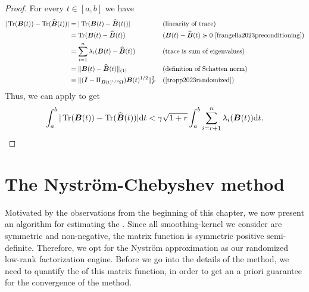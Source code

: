 \begin{proof}
     For every $t \in [a, b]$ we have
    \begin{align}
        |\Tr(\mtx{B}(t)) - \Tr(\widehat{\mtx{B}}(t))|
            &= |\Tr(\mtx{B}(t) - \widehat{\mtx{B}}(t))| && \text{(linearity of trace)} \notag \\ 
            &= \Tr(\mtx{B}(t) - \widehat{\mtx{B}}(t)) &&  \text{($\mtx{B}(t) - \widehat{\mtx{B}}(t) \succcurlyeq 0$ \cite[lemma~2.1]{frangella2023preconditioning})} \notag \\ 
            &= \sum_{i=1}^n \lambda_i(\mtx{B}(t) - \widehat{\mtx{B}}(t)) &&  \text{(trace is sum of eigenvalues)} \notag \\
            &= \lVert \mtx{B}(t) - \widehat{\mtx{B}}(t) \rVert _{(1)} && \text{(definition of Schatten norm)} \notag \\
            &= \lVert (\mtx{I} - \Pi_{\mtx{B}(t)^{1/2} \mtx{\Omega}})\mtx{B}(t)^{1/2} \rVert _F^2 && \text{(\cite[proof of corollary 8.8]{tropp2023randomized})}
    \end{align}
    Thus, we can apply \cite[theorem~9]{kressner2023randomized} to get
    \begin{equation}
        \int_{a}^{b} |\operatorname{Tr}(\boldsymbol{B}(t)) - \operatorname{Tr}(\widehat{\boldsymbol{B}}(t))| \mathrm{d}t
            < \gamma \sqrt{1 + r} \int_{a}^{b} \sum_{i = r+1}^n \lambda_i(\boldsymbol{B}(t)) \mathrm{d}t.
    \end{equation}
\end{proof}


\section{The Nystr\"om-Chebyshev method}
\label{sec:3-nystrom-nystrom-chebyshev}

Motivated by the observations from the beginning of this chapter, we now present
an algorithm for estimating the .
Since all \gls{smoothing-kernel} we consider are symmetric
and non-negative, the matrix function  is
symmetric positive semi-definite. Therefore, we opt for the Nystr\"om approximation
as our randomized low-rank factorization engine. Before we go into the details
of the method, we need to quantify the  of this matrix
function, in order to get an a priori guarantee for the convergence of the 
method.\\


